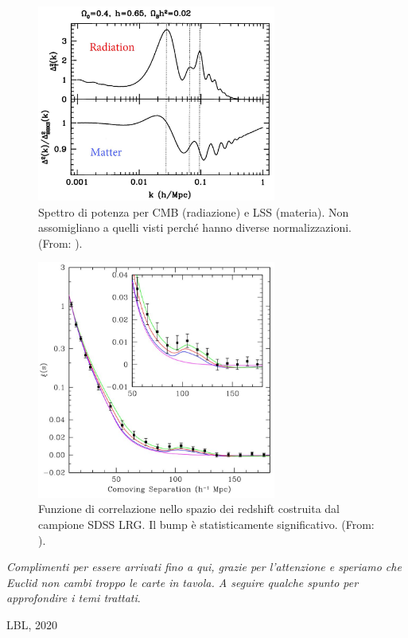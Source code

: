 \begin{figure}[ht]
    \centering
    \includegraphics[width=0.7\textwidth]{Pictures/11/BAO.jpg}
    \caption{Spettro di potenza per CMB (radiazione) e LSS (materia). Non assomigliano a quelli visti perché hanno diverse normalizzazioni. (From: \cite{Meiksin_1999}).}\label{fig11:bao}
\end{figure}

\begin{figure}[ht]
    \centering
    \includegraphics[width=0.7\textwidth]{Pictures/11/baoobs.jpg}
    \caption{Funzione di correlazione nello spazio dei redshift costruita dal campione SDSS LRG. Il bump è statisticamente significativo. (From: \cite{Eisenstein_2005}).}\label{fig11:baoobs}
\end{figure}

\vfill
\textit{Complimenti per essere arrivati fino a qui, grazie per l'attenzione e speriamo che Euclid non cambi troppo le carte in tavola. A seguire qualche spunto per approfondire i temi trattati}.

\vspace{1em}
\begin{flushright}
LBL, 2020
\end{flushright}